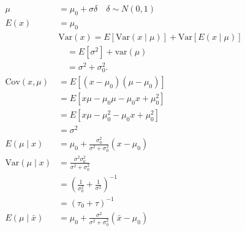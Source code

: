 \documentclass[12pt]{article}
\begin{document}
\begin{appendices}
\begin{equation*}
\begin{aligned}
   \mu &= \mu_0 + \sigma\delta \quad \delta \sim N(0, 1)\\
   E(x) &= \mu_0\\
   & \text{Var}(x) = E[\text{Var}(x \mid \mu)] + \text{Var}[E(x \mid \mu)] \\
   & \quad = E[\sigma^2] + \text{var}(\mu) \\
   & \quad = \sigma^2 + \sigma_0^2.\\
    \text{Cov}(x, \mu) &= E[(x - \mu_0)(\mu - \mu_0)] \\
    &= E[x\mu - \mu_0 \mu - \mu_0 x + \mu_0^2] \\
    &= E[x\mu - \mu_0^2 - \mu_0 x + \mu_0^2] \\
    &= \sigma^2 \\
    E(\mu \mid x) &= \mu_0 + \frac{\sigma_0^2}{\sigma^2 + \sigma_0^2}(x - \mu_0) \\
    \text{Var}(\mu \mid x) &= \frac{\sigma^2 \sigma_0^2}{\sigma^2 + \sigma_0^2} \\
    &= \left( \frac{1}{\sigma_0^2} + \frac{1}{\sigma^2} \right)^{-1} \\
    &= (\tau_0 + \tau)^{-1}\\
    E(\mu \mid \bar{x}) &= \mu_0 + \frac{\sigma^2}{\sigma^2 + \sigma_0^2}(\bar{x} - \mu_0)
\end{aligned}
\end{equation*}

\end{appendices}
\end{document}
